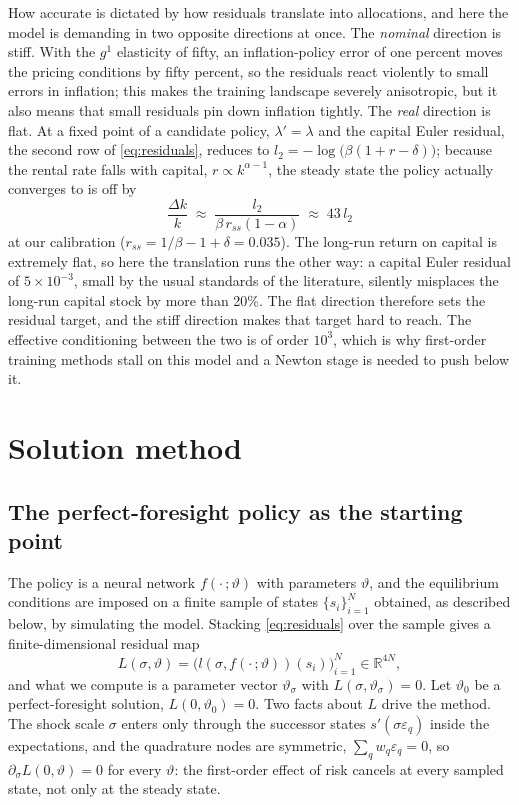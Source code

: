 \documentclass[11pt]{article}
\newcommand{\R}{\mathbb{R}}
\begin{document}
How accurate is dictated by how residuals translate into allocations, and
here the model is demanding in two opposite directions at once. The
\emph{nominal} direction is stiff. With the $g^1$ elasticity of fifty, an
inflation-policy error of one percent moves the pricing conditions by fifty
percent, so the residuals react violently to small errors in inflation; this
makes the training landscape severely anisotropic, but it also means that
small residuals pin down inflation tightly. The \emph{real} direction is
flat. At a fixed point of a candidate policy, $\lambda' = \lambda$ and the
capital Euler residual, the second row of \eqref{eq:residuals}, reduces to
$l_2 = -\log\big(\beta(1 + r - \delta)\big)$; because the rental rate falls
with capital, $r \propto k^{\alpha-1}$, the steady state the policy actually
converges to is off by
\begin{equation*}
\frac{\Delta k}{k} \;\approx\; \frac{l_2}{\beta\, r_{ss} (1-\alpha)}
\;\approx\; 43\, l_2
\end{equation*}
at our calibration ($r_{ss} = 1/\beta - 1 + \delta = 0.035$). The long-run
return on capital is extremely flat, so here the translation runs the other
way: a capital Euler residual of $5\times10^{-3}$, small by the usual standards of
the literature, silently misplaces the long-run capital stock by more than
20\%. The flat direction therefore sets the residual target, and the
stiff direction makes that target hard to reach. The effective conditioning
between the two is of order $10^3$, which is why first-order training methods
stall on this model and a Newton stage is needed to push below it.


\section{Solution method}

\subsection{The perfect-foresight policy as the starting point}

The policy is a neural network $f(\cdot\,;\vartheta)$ with parameters $\vartheta$, and the equilibrium conditions are imposed on a finite sample of states $\{s_i\}_{i=1}^N$ obtained, as described below, by simulating the model. Stacking \eqref{eq:residuals} over the sample gives a finite-dimensional residual map
\begin{equation}
L(\sigma, \vartheta) = \big( l(\sigma, f(\cdot\,;\vartheta))(s_i) \big)_{i=1}^{N} \in \R^{4N},
\label{eq:L}
\end{equation}
and what we compute is a parameter vector $\vartheta_\sigma$ with $L(\sigma, \vartheta_\sigma) = 0$. Let $\vartheta_0$ be a perfect-foresight solution, $L(0, \vartheta_0) = 0$. Two facts about $L$ drive the method. The shock scale $\sigma$ enters only through the successor states $s'(\sigma \varepsilon_q)$ inside the expectations, and the quadrature nodes are symmetric, $\sum_q w_q \varepsilon_q = 0$, so $\partial_\sigma L(0, \vartheta) = 0$ for every $\vartheta$: the first-order effect of risk cancels at every sampled state, not only at the steady state.
\end{document}
